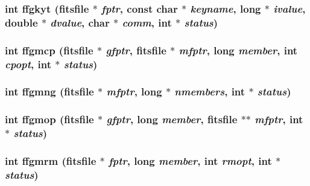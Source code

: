 \subsubsection{\setlength{\rightskip}{0pt plus 5cm}int ffgkyt (\bf{fitsfile} $\ast$ {\em fptr}, const char $\ast$ {\em keyname}, long $\ast$ {\em ivalue}, double $\ast$ {\em dvalue}, char $\ast$ {\em comm}, int $\ast$ {\em status})}\label{fitsio_8h_dd68662c84062c1a1c4433358adb0e3f}


\subsubsection{\setlength{\rightskip}{0pt plus 5cm}int ffgmcp (\bf{fitsfile} $\ast$ {\em gfptr}, \bf{fitsfile} $\ast$ {\em mfptr}, long {\em member}, int {\em cpopt}, int $\ast$ {\em status})}\label{fitsio_8h_d83bfc8f05c1ecdb704484508df35e48}


\subsubsection{\setlength{\rightskip}{0pt plus 5cm}int ffgmng (\bf{fitsfile} $\ast$ {\em mfptr}, long $\ast$ {\em nmembers}, int $\ast$ {\em status})}\label{fitsio_8h_4ce8704aab9e63b3a93ccbf135f20eab}


\subsubsection{\setlength{\rightskip}{0pt plus 5cm}int ffgmop (\bf{fitsfile} $\ast$ {\em gfptr}, long {\em member}, \bf{fitsfile} $\ast$$\ast$ {\em mfptr}, int $\ast$ {\em status})}\label{fitsio_8h_eb970a59dfa22c61d5df8bc212391228}


\subsubsection{\setlength{\rightskip}{0pt plus 5cm}int ffgmrm (\bf{fitsfile} $\ast$ {\em fptr}, long {\em member}, int {\em rmopt}, int $\ast$ {\em status})}\label{fitsio_8h_ae2190c557659d6bea87a6ba2e5c152b}


